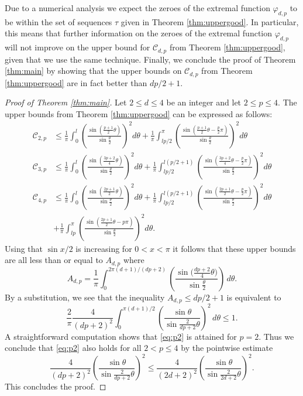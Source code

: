 \documentclass{amsart}
\theoremstyle{plain}
\theoremstyle{remark}
\begin{document}
	Due to a numerical analysis we expect the zeroes of the extremal function $\varphi_{d, p}$ to be within the set of sequences $\tau$ given in Theorem \ref{thm:uppergood}. In particular, this means that further information on the zeroes of the extremal function $\varphi_{d, p}$ will not improve on the upper bound for $\mathscr{C}_{d,p}$ from Theorem \ref{thm:uppergood}, given that we use the same technique. Finally, we conclude the proof of Theorem \ref{thm:main} by showing that the upper bounds on $\mathscr{C}_{d,p}$ from Theorem \ref{thm:uppergood} are in fact better than $dp/2+1$. 
	
	\begin{proof}[Proof of Theorem \ref{thm:main}]
		Let $2 \leq d \leq 4$ be an integer and let $2 \leq p \leq 4$. The upper bounds from Theorem \ref{thm:uppergood} can be expressed as follows:
		\[\begin{split}
			\mathscr{C}_{2,p} &\leq \frac{1}{\pi} \int_{0}^{l} \left(\frac{\sin ( \frac{p+1}{2} \theta)}{\sin \frac{\theta}{2}} \right)^2 d\theta+ \frac{1}{\pi}\int_{lp/2}^{\pi} \left(\frac{\sin ( \frac{p+1}{2} \theta-\frac{p}{2}\pi)}{\sin \frac{\theta}{2}} \right)^2 d\theta\\
			\mathscr{C}_{3,p} & \leq
			\frac{1}{\pi}\int_{0}^{l} \left(\frac{\sin ( \frac{3p+2}{4} \theta)}{\sin \frac{\theta}{2}} \right)^2 d\theta+ \frac{1}{\pi}\int_{lp/2}^{l(p/2+1)} \left(\frac{\sin ( \frac{3p+2}{4} \theta-\frac{p}{2}\pi)}{\sin \frac{\theta}{2}} \right)^2 d\theta\\
			\mathscr{C}_{4,p} & \leq  \frac{1}{\pi}\int_{0}^{l} \left(\frac{\sin ( \frac{2p+1}{2} \theta)}{\sin \frac{\theta}{2}} \right)^2 d\theta+ \frac{1}{\pi}\int_{lp/2}^{l(p/2+1)} \left(\frac{\sin ( \frac{2p+1}{2} \theta-\frac{p}{2}\pi)}{\sin \frac{\theta}{2}} \right)^2 d\theta\\&+ \frac{1}{\pi}\int_{lp}^{\pi} \left(\frac{\sin ( \frac{2p+1}{2} \theta-p\pi)}{\sin \frac{\theta}{2}} \right)^2 d\theta.
		\end{split}\]
		Using that $\sin x/2$ is increasing for $0<x<\pi$ it follows that these upper bounds are all less than or equal to $A_{d,p}$ where 
		\[A_{d,p}=\frac{1}{\pi} \int_{0}^{2\pi(d+1)/(dp+2)} \left( \frac{\sin \big( \frac{dp+2}{4} \theta \big)}{\sin \frac{\theta}{2}}\right) \, d\theta.\]
		By a substitution, we see that the inequality $A_{d,p} \leq dp/2+1$ is equivalent to 
		\begin{equation}\label{eq:p2} \frac{2}{\pi} \frac{4}{(dp+2)^2} \int_{0}^{\pi(d+1)/2} \left( \frac{\sin \theta}{\sin \frac{2}{dp+2} \theta }\right)^2 \, d\theta \leq 1.
		\end{equation} A straightforward computation shows that \eqref{eq:p2} is attained for $p=2$. Thus we conclude that \eqref{eq:p2} also holds for all $2<p \leq 4$ by the pointwise estimate
		\[\frac{4}{(dp+2)^2}\left( \frac{\sin \theta}{\sin \frac{2}{dp+2} \theta }\right)^2 \leq \frac{4}{(2d+2)^2}\left( \frac{\sin \theta}{\sin \frac{2}{2d+2} \theta }\right)^2. \]
		This concludes the proof. 
	\end{proof}
\end{document}

